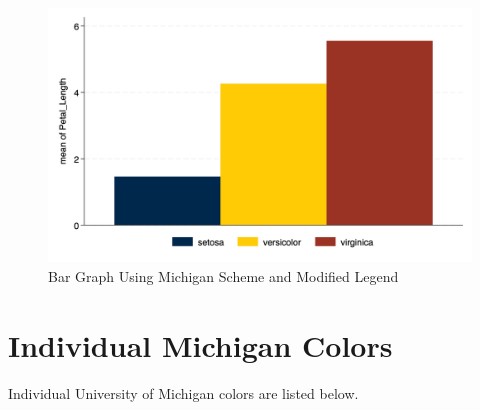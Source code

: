 \documentclass[
  letterpaper,
  DIV=11,
  numbers=noendperiod]{scrartcl}
\begin{document}
\begin{figure}[H]

{\centering \includegraphics[width=0.5\linewidth,height=\textheight,keepaspectratio]{mybargraph3.png}

}

\caption{Bar Graph Using Michigan Scheme and Modified Legend}

\end{figure}%

\section{Individual Michigan Colors}\label{individual-michigan-colors}

Individual University of Michigan colors are listed below.
\end{document}

